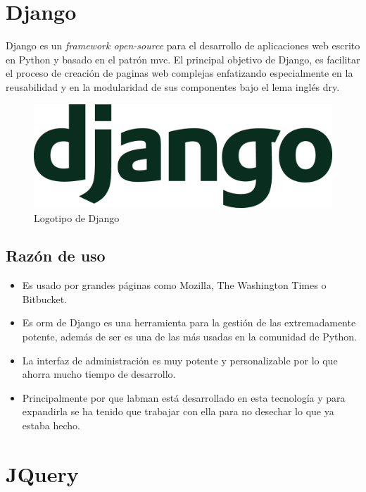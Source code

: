 \section{Django}

Django es un \textit{framework open-source} para el desarrollo de aplicaciones web escrito en Python y basado en el patrón \acrfull{mvc}. El principal objetivo de Django, es facilitar el proceso de creación de paginas web complejas enfatizando especialmente en la reusabilidad y en la modularidad de sus componentes bajo el lema inglés \acrfull{dry}.

\begin{figure}[!htbp]
	\centering
	\includegraphics[scale=0.18]{fig/django_logo}
	\caption{Logotipo de Django}
\end{figure}

\subsection{Razón de uso}

\begin{itemize}
	\item Es usado por grandes páginas como Mozilla, The Washington Times\cite{TWT} o Bitbucket\cite{Bitbucket}.
	\item Es \acrshort{orm} de Django es una herramienta para la gestión de las  extremadamente potente, además de ser es una de las más usadas en la comunidad de Python.
	\item La interfaz de administración es muy potente y personalizable por lo que ahorra mucho tiempo de desarrollo.
	\item Principalmente por que \acrshort{labman} está desarrollado en esta tecnología y para expandirla se ha tenido que trabajar con ella para no desechar lo que ya estaba hecho.
\end{itemize}

\section{JQuery}

